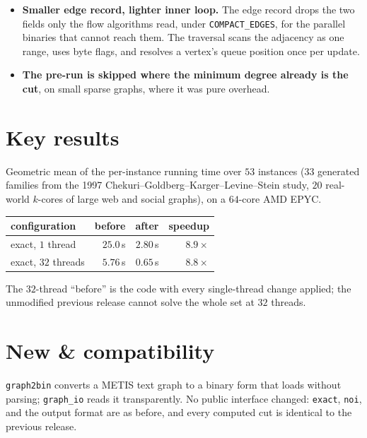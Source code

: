 \documentclass[10pt]{article}
\newcommand{\cfg}[1]{\texttt{#1}}
\begin{document}
\begin{itemize}
  found the shared neighbourhood of the two vertices being merged through an \cfg{unordered\_map} rebuilt on every
  merge, on the hottest contraction path. They now use a stamp array (an epoch counter per vertex, so clearing is
  free) that persists with the graph, turning each lookup into an indexed read. On the dense weighted families the
  hash was most of the cost of a round.
  \item \textbf{Smaller edge record, lighter inner loop.} The edge record drops the two fields only the flow
  algorithms read, under \cfg{COMPACT\_EDGES}, for the parallel binaries that cannot reach them. The traversal
  scans the adjacency as one range, uses byte flags, and resolves a vertex's queue position once per update.
  \item \textbf{The pre-run is skipped where the minimum degree already is the cut}, on small sparse graphs,
  where it was pure overhead.
\end{itemize}

\section{Key results}
Geometric mean of the per-instance running time over $53$ instances ($33$ generated families from the 1997
Chekuri--Goldberg--Karger--Levine--Stein study, $20$ real-world $k$-cores of large web and social graphs), on a
$64$-core AMD EPYC.
\begin{center}
\begin{tabular}{@{}lrrr@{}}
\toprule
configuration & before & after & speedup\\
\midrule
exact, $1$ thread   & $25.0$\,s & $2.80$\,s & $8.9\times$\\
exact, $32$ threads & $5.76$\,s & $0.65$\,s & $8.8\times$\\
\bottomrule
\end{tabular}
\end{center}
The $32$-thread ``before'' is the code with every single-thread change applied; the unmodified previous release
cannot solve the whole set at $32$ threads.

\section{New \& compatibility}
\cfg{graph2bin} converts a METIS text graph to a binary form that loads without parsing; \cfg{graph\_io} reads it
transparently. No public interface changed: \cfg{exact}, \cfg{noi}, and the output format are as before, and every
computed cut is identical to the previous release.
\end{document}
